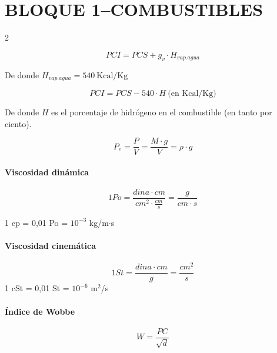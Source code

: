 \documentclass[11pt]{article}
\begin{document}
\maketitle
\thispagestyle{fancy}

\section*{BLOQUE 1--COMBUSTIBLES}

\begin{multicols*}{2}

    \begin{equation}
        PCI = PCS + g_v \cdot H_{vap.agua}
    \end{equation}

    De donde $H_{vap.agua} = 540 \ \mathrm{Kcal/Kg}$

    \begin{equation}
        PCI = PCS - 540 \cdot H \ \text{(en Kcal/Kg)}
    \end{equation}

    De donde $H$ es el porcentaje de hidrógeno en el combustible (en tanto por ciento).

    \begin{equation}
        P_e = \frac{P}{V} = \frac{M \cdot g}{V} = \rho \cdot g
    \end{equation}

    \paragraph*{Viscosidad dinámica}

    \begin{equation*}
        1 Po = \frac{dina \cdot cm}{cm^{2} \cdot \frac{cm}{s}} = \frac{g}{cm \cdot s}
    \end{equation*}

    1 cp = 0,01 Po = $10^{-3}$ kg/m$\cdot$s

    \paragraph*{Viscosidad cinemática}

    \begin{equation*}
        1 St = \frac{dina \cdot cm}{g} = \frac{cm^2}{s}
    \end{equation*}
    1 cSt = 0,01 St = $10^{-6}$ m$^2$/s

    \paragraph*{Índice de Wobbe}
    \begin{equation}
        W = \frac{PC}{\sqrt{d}}
    \end{equation}


\end{multicols*}
\end{document}
